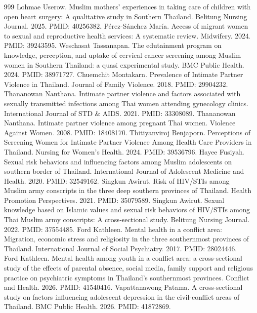 \begin{thebibliography}{999}
 Lohmae Userow. Muslim mothers' experiences in taking care of children with open heart surgery: A qualitative study in Southern Thailand. Belitung Nursing Journal. 2025. PMID: 40256382.
 Pérez-Sánchez María. Access of migrant women to sexual and reproductive health services: A systematic review. Midwifery. 2024. PMID: 39243595.
 Weschasat Tassanapan. The edutainment program on knowledge, perception, and uptake of cervical cancer screening among Muslim women in Southern Thailand: a quasi experimental study. BMC Public Health. 2024. PMID: 38971727.
 Chuemchit Montakarn. Prevalence of Intimate Partner Violence in Thailand. Journal of Family Violence. 2018. PMID: 29904232.
 Thananowan Nanthana. Intimate partner violence and factors associated with sexually transmitted infections among Thai women attending gynecology clinics. International Journal of STD \& AIDS. 2021. PMID: 33308089.
 Thananowan Nanthana. Intimate partner violence among pregnant Thai women. Violence Against Women. 2008. PMID: 18408170.
 Thitiyanviroj Benjaporn. Perceptions of Screening Women for Intimate Partner Violence Among Health Care Providers in Thailand. Nursing for Women's Health. 2024. PMID: 39536796.
 Hayee Fusiyah. Sexual risk behaviors and influencing factors among Muslim adolescents on southern border of Thailand. International Journal of Adolescent Medicine and Health. 2020. PMID: 32549162.
 Singkun Awirut. Risk of HIV/STIs among Muslim army conscripts in the three deep southern provinces of Thailand. Health Promotion Perspectives. 2021. PMID: 35079589.
 Singkun Awirut. Sexual knowledge based on Islamic values and sexual risk behaviors of HIV/STIs among Thai Muslim army conscripts: A cross-sectional study. Belitung Nursing Journal. 2022. PMID: 37554485.
 Ford Kathleen. Mental health in a conflict area: Migration, economic stress and religiosity in the three southernmost provinces of Thailand. International Journal of Social Psychiatry. 2017. PMID: 28024446.
 Ford Kathleen. Mental health among youth in a conflict area: a cross-sectional study of the effects of parental absence, social media, family support and religious practice on psychiatric symptoms in Thailand's southernmost provinces. Conflict and Health. 2026. PMID: 41540416.
 Vapattanawong Patama. A cross-sectional study on factors influencing adolescent depression in the civil-conflict areas of Thailand. BMC Public Health. 2026. PMID: 41872869.

\end{thebibliography}
